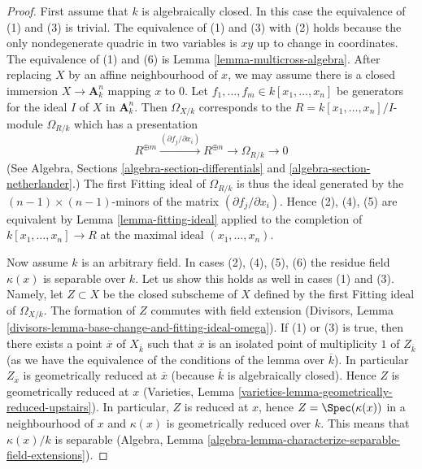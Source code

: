 \begin{proof}
First assume that $k$ is algebraically closed.
In this case the equivalence of (1) and (3) is trivial.
The equivalence of (1) and (3) with (2) holds because the only
nondegenerate quadric in two variables is $xy$ up to change in
coordinates. The equivalence of (1) and (6) is 
Lemma \ref{lemma-multicross-algebra}.
After replacing $X$ by an affine neighbourhood
of $x$, we may assume there is a closed immersion $X \to \mathbf{A}^n_k$
mapping $x$ to $0$. Let $f_1, \ldots, f_m \in k[x_1, \ldots, x_n]$
be generators for the ideal $I$ of $X$ in $\mathbf{A}^n_k$.
Then $\Omega_{X/k}$ corresponds to the $R = k[x_1, \ldots, x_n]/I$-module
$\Omega_{R/k}$ which has a presentation
$$
R^{\oplus m} \xrightarrow{(\partial f_j/\partial x_i)}
R^{\oplus n} \to \Omega_{R/k} \to 0
$$
(See Algebra, Sections \ref{algebra-section-differentials} and
\ref{algebra-section-netherlander}.)
The first Fitting ideal of $\Omega_{R/k}$ is thus the ideal
generated by the $(n - 1) \times (n - 1)$-minors of the
matrix $(\partial f_j/\partial x_i)$. Hence (2), (4), (5)
are equivalent by Lemma \ref{lemma-fitting-ideal} applied
to the completion of $k[x_1, \ldots, x_n] \to R$
at the maximal ideal $(x_1, \ldots, x_n)$.

\medskip\noindent
Now assume $k$ is an arbitrary field.
In cases (2), (4), (5), (6) the residue field $\kappa(x)$ is
separable over $k$. Let us show this holds as well
in cases (1) and (3). Namely, let $Z \subset X$ be the closed subscheme
of $X$ defined by the first Fitting ideal of $\Omega_{X/k}$.
The formation of $Z$ commutes with field extension
(Divisors, Lemma \ref{divisors-lemma-base-change-and-fitting-ideal-omega}).
If (1) or (3) is true, then there exists a point
$\overline{x}$ of $X_{\overline{k}}$ such that $\overline{x}$
is an isolated point of multiplicity $1$ of $Z_{\overline{k}}$ (as we have the
equivalence of the conditions of the lemma over $\overline{k}$).
In particular $Z_{\overline{x}}$ is geometrically reduced at $\overline{x}$
(because $\overline{k}$ is algebraically closed). Hence
$Z$ is geometrically reduced at $x$
(Varieties, Lemma \ref{varieties-lemma-geometrically-reduced-upstairs}).
In particular, $Z$ is reduced at $x$, hence $Z = \Spec(\kappa(x))$
in a neighbourhood of $x$ and $\kappa(x)$ is geometrically reduced
over $k$. This means that $\kappa(x)/k$ is separable
(Algebra, Lemma \ref{algebra-lemma-characterize-separable-field-extensions}).


\end{proof}
